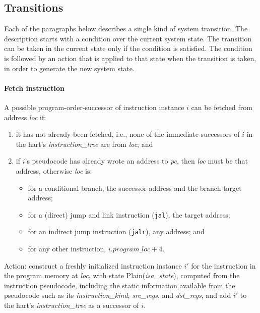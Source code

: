 \subsection{Transitions}\label{sec:omm:transitions}

Each of the paragraphs below describes a single kind of system transition.
The description starts with a condition over the current system state.
The transition can be taken in the current state only if the condition is satisfied.
The condition is followed by an action that is applied to that state when the transition is taken, in order to generate the new system state.

\paragraph{Fetch instruction}\label{omm:fetch}
A possible program-order-successor of instruction instance $i$ can be fetched from address {\it loc} if:
\begin{enumerate}
\item it has not already been fetched, i.e., none of the immediate successors of $i$ in the hart's {\it instruction\_tree} are from {\it loc}; and
\item if $i$'s pseudocode has already wrote an address to {\em pc}, then {\it loc} must be that address, otherwise {\it loc} is:
  \begin{itemize}
  \item for a conditional branch, the successor address and the branch target address;
  \item for a (direct) jump and link instruction ({\tt jal}), the target address;
  \item for an indirect jump instruction ({\tt jalr}), any address; and
  \item for any other instruction, $i.\textit{program\_loc}+4$.
  \end{itemize}
\end{enumerate}

Action: construct a freshly initialized instruction instance $i'$ for the instruction in the program memory at {\it loc}, with state {\sc Plain}({\it isa\_state}), computed from the instruction pseudocode, including the static information available from the pseudocode such as its {\it instruction\_kind}, {\it src\_regs}, and {\it dst\_regs}, and add $i'$ to the hart's {\it instruction\_tree} as a successor of $i$.

